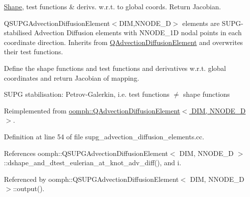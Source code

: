 \hyperlink{classoomph_1_1Shape}{Shape}, test functions \& derivs. w.\+r.\+t. to global coords. Return Jacobian. 

Q\+S\+U\+P\+G\+Advection\+Diffusion\+Element$<$\+D\+I\+M,\+N\+N\+O\+D\+E\+\_\+D$>$ elements are S\+U\+P\+G-\/stabilised Advection Diffusion elements with N\+N\+O\+D\+E\+\_\+1D nodal points in each coordinate direction. Inherits from \hyperlink{classoomph_1_1QAdvectionDiffusionElement}{Q\+Advection\+Diffusion\+Element} and overwrites their test functions.

Define the shape functions and test functions and derivatives w.\+r.\+t. global coordinates and return Jacobian of mapping.

S\+U\+PG stabilisation\+: Petrov-\/\+Galerkin, i.\+e. test functions $ \ne $ shape functions 

Reimplemented from \hyperlink{classoomph_1_1QAdvectionDiffusionElement_a968920ec8057c9b5a49154c5845c7dbd}{oomph\+::\+Q\+Advection\+Diffusion\+Element$<$ D\+I\+M, N\+N\+O\+D\+E\+\_\+D $>$}.



Definition at line 54 of file supg\+\_\+advection\+\_\+diffusion\+\_\+elements.\+cc.



References oomph\+::\+Q\+S\+U\+P\+G\+Advection\+Diffusion\+Element$<$ D\+I\+M, N\+N\+O\+D\+E\+\_\+D $>$\+::dshape\+\_\+and\+\_\+dtest\+\_\+eulerian\+\_\+at\+\_\+knot\+\_\+adv\+\_\+diff(), and i.



Referenced by oomph\+::\+Q\+S\+U\+P\+G\+Advection\+Diffusion\+Element$<$ D\+I\+M, N\+N\+O\+D\+E\+\_\+D $>$\+::output().

\mbox{\label{classoomph_1_1QSUPGAdvectionDiffusionElement_af77acfc13df8c460118d2c1bfbf0d74d}} 
